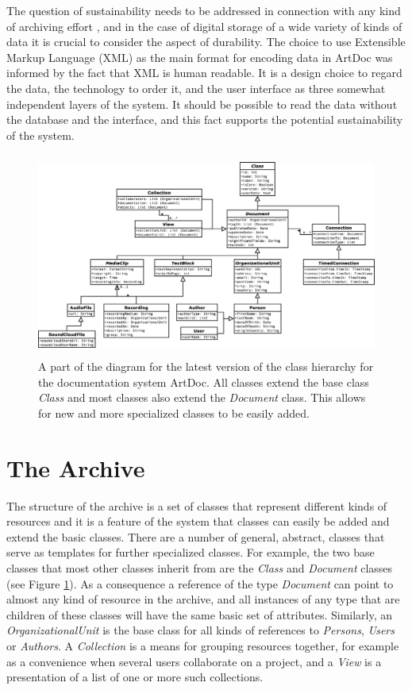 \documentclass[,a4paper]{llncs}
\begin{document}
The question of sustainability needs to be addressed in connection with any kind of archiving effort \cite{frisk-bullock08}, and in the case of digital storage of a wide variety of kinds of data it is crucial to consider the aspect of durability. The choice to use Extensible Markup Language (XML) as the main format for encoding data in ArtDoc was informed by the fact that XML is human readable. It is a design choice to regard the data, the technology to order it, and the user interface as three somewhat independent layers of the system. It should be possible to read the data without the database and the interface, and this fact supports the potential sustainability of the system.

\begin{figure}
\centering
\includegraphics[height=6.7cm]{img/classdiagram-2018-sub.eps}
\caption{A part of the diagram for the latest version of the class hierarchy for the documentation system ArtDoc. All classes extend the base class \emph{Class} and most classes also extend the \emph{Document} class. This allows for new and more specialized classes to be easily added.}
\label{fig:example}
\end{figure}

\section{The Archive}
\label{sec:archive}
The structure of the archive is a set of classes that represent different kinds of resources and it is a feature of the system that classes can easily be added and extend the basic classes. There are a number of general, abstract, classes that serve as templates for further specialized classes. For example, the two base classes that most other classes inherit from are the \emph{Class} and \emph{Document} classes (see Figure \ref{fig:example}). As a consequence a reference of the type \emph{Document} can point to almost any kind of resource in the archive, and all instances of any type that are children of these classes will have the same basic set of attributes. Similarly, an \emph{OrganizationalUnit} is the base class for all kinds of references to \emph{Persons}, \emph{Users} or \emph{Authors}. A \emph{Collection} is a means for grouping resources together, for example as a convenience when several users collaborate on a project, and a \emph{View} is a presentation of a list of one or more such collections.
\end{document}
